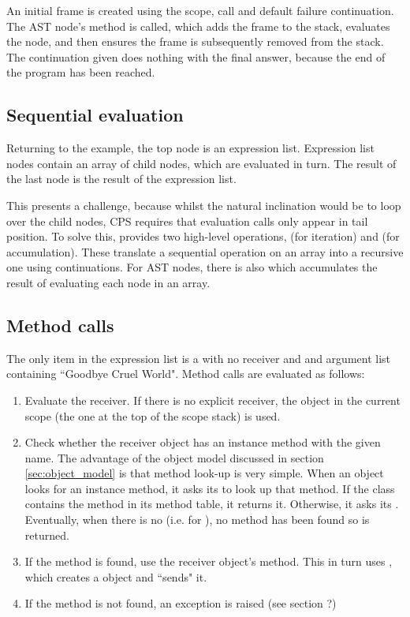 An initial frame is created using the scope, call and default failure continuation. The AST node's  method is called, which adds the frame to the stack, evaluates the node, and then ensures the frame is subsequently removed from the stack. The continuation given does nothing with the final answer, because the end of the program has been reached.

\subsection{Sequential evaluation}

Returning to the example, the top node is an expression list. Expression list nodes contain an array of child nodes, which are evaluated in turn. The result of the last node is the result of the expression list.

This presents a challenge, because whilst the natural inclination would be to loop over the child nodes, CPS requires that evaluation calls only appear in tail position. To solve this,  provides two high-level operations,  (for iteration) and  (for accumulation). These translate a sequential operation on an array into a recursive one using continuations. For AST nodes, there is also  which accumulates the result of evaluating each node in an array.

\subsection{Method calls}

The only item in the expression list is a  with no receiver and and argument list containing ``Goodbye Cruel World". Method calls are evaluated as follows:

\begin{enumerate}
  \item Evaluate the receiver. If there is no explicit receiver, the  object in the current scope (the one at the top of the scope stack) is used.
  \item Check whether the receiver object has an instance method with the given name. The advantage of the object model discussed in section \ref{sec:object_model} is that method look-up is very simple. When an object looks for an instance method, it asks its  to look up that method. If the class contains the method in its method table, it returns it. Otherwise, it asks its . Eventually, when there is no  (i.e. for ), no method has been found so  is returned.
  \item If the method is found, use the receiver object's  method. This in turn uses , which creates a  object and ``sends" it.
  \item If the method is not found, an exception is raised (see section ?)
\end{enumerate}

